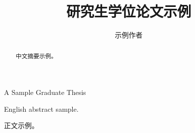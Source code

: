 \documentclass{xmu-graduate}
\begin{document}
\title{研究生学位论文示例}{A Sample Graduate Thesis}
\author{示例作者}
\subject{示例专业}
\maketitle
\makeoriginality
\makecopyright
\makeaideclaration
\begin{abstract}中文摘要示例。\end{abstract}
\begin{enabstract}English abstract sample.\end{enabstract}
\tableofcontents
{}
正文示例。
\end{document}
